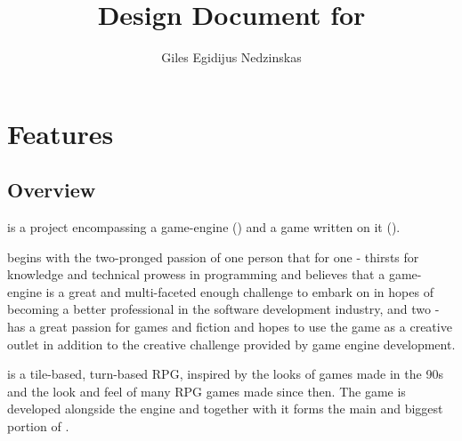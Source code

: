 \documentclass[a4paper,10pt]{book}
\begin{document}
\newcommand{\isogridsub}[1] {
\begin{tikzpicture}
  \foreach \i in {0, 2, ..., #1} {
    \draw (#1/2 + \i/2, #1 - \i/4) node[anchor=south west] {$\i$}
       -- (0 + \i/2, #1/1.33 - \i/4) node[anchor=north east] {$\i$};
    \draw (#1/2 - \i/2, #1 - \i/4) node[anchor=south east] {$\i$}
       -- (#1 - \i/2, #1/1.33 - \i/4) node[anchor=north west] {$\i$};
  }
  \foreach \i in {1, 3, ..., #1} {
    \draw[gray,dashed] (#1/2 + \i/2, #1 - \i/4) node[anchor=south west] {$\i$}
       -- (0 + \i/2, #1/1.33 - \i/4) node[anchor=north east] {$\i$};
    \draw[gray,dashed] (#1/2 - \i/2, #1 - \i/4) node[anchor=south east] {$\i$}
       -- (#1 - \i/2, #1/1.33 - \i/4) node[anchor=north west] {$\i$};
  }
\end{tikzpicture}
}
\newcommand{\textbi}[1]{\textbf{\textit{#1}}}
\newcommand{\codew}[1]{\mbox{\texttt{#1}}}

\author{Giles Egidijus Nedzinskas}
\title{Design Document for \Projectname{}}
\maketitle{}

\tableofcontents

\part{Features}

\chapter{Overview}
\Projectname{} is a project encompassing a game-engine (\Enginename{}) and a
game written on it (\Gamename{}).

\Projectname{} begins with the two-pronged passion of one person that for one -
thirsts for knowledge and technical prowess in programming and believes that a
game-engine is a great and multi-faceted enough challenge to embark on in hopes
of becoming a better professional in the software development industry, and two
- has a great passion for games and fiction and hopes to use the game as a
creative outlet in addition to the creative challenge provided by game engine
development.

\Gamename{} is a tile-based, turn-based RPG, inspired by the looks of games
made in the 90s and the look and feel of many RPG games made since then. The
game is developed alongside the engine \Enginename{} and together with it forms
the main and biggest portion of \Projectname{}.
\end{document}
